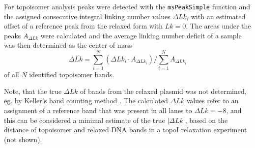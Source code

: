 \documentclass[10pt,a4]{article}
\def\cite#1{\hypersetup{citecolor=Teal}\citep{#1}} %
\begin{document}
For topoisomer analysis peaks were detected with the
\texttt{msPeakSimple} function and the assigned consecutive integral
linking number values $\Delta Lk_i$ with an estimated offset of a
reference peak from the relaxed form with $Lk=0$. The areas under the
peaks $A_{\Delta Lk}$ were calculated and the average linking number
deficit of a sample was then determined as the center of mass
\begin{equation}
  \label{eq:dlk}
  \Delta \overline{Lk} = \sum_{i=1}^N{(\Delta Lk_i \cdot
    A_{\Delta Lk_i})}/\sum_{i=1}^N{A_{\Delta Lk_i}}
\end{equation}
of all $N$ identified topoisomer bands.

Note, that the true $\Delta Lk$ of bands from the relaxed plasmid was
not determined, eg. by Keller's band counting method
\cite{Keller1975b}.  The calculated $\Delta Lk$ values refer to an
assignment of a reference band that was present in all lanes to
$\Delta Lk=-8$, and this can be considered a minimal estimate of the
true $|\Delta Lk|$, based on the distance of topoisomer and relaxed DNA
bands in a topoI relaxation experiment (not shown).

\setlength{\bibsep}{0.0pt}
\begin{spacing}{0.9}
  
\end{spacing}
\end{document}
